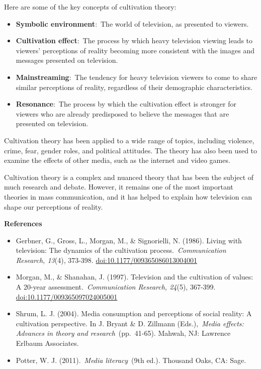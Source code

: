 \documentclass[
]{book}
\begin{document}
Here are some of the key concepts of cultivation theory:

\begin{itemize}
\item
  \textbf{Symbolic environment}:~The world of television, as presented to viewers.
\item
  \textbf{Cultivation effect}:~The process by which heavy television viewing leads to viewers' perceptions of reality becoming more consistent with the images and messages presented on television.
\item
  \textbf{Mainstreaming}:~The tendency for heavy television viewers to come to share similar perceptions of reality, regardless of their demographic characteristics.
\item
  \textbf{Resonance}:~The process by which the cultivation effect is stronger for viewers who are already predisposed to believe the messages that are presented on television.
\end{itemize}

Cultivation theory has been applied to a wide range of topics, including violence, crime, fear, gender roles, and political attitudes. The theory has also been used to examine the effects of other media, such as the internet and video games.

Cultivation theory is a complex and nuanced theory that has been the subject of much research and debate. However, it remains one of the most important theories in mass communication, and it has helped to explain how television can shape our perceptions of reality.

\textbf{References}

\begin{itemize}
\item
  Gerbner, G., Gross, L., Morgan, M., \& Signorielli, N. (1986). Living with television: The dynamics of the cultivation process.~\emph{Communication Research, 13}(4), 373-398. \url{doi:10.1177/009365086013004001}
\item
  Morgan, M., \& Shanahan, J. (1997). Television and the cultivation of values: A 20-year assessment.~\emph{Communication Research, 24}(5), 367-399. \url{doi:10.1177/009365097024005001}
\item
  Shrum, L. J. (2004). Media consumption and perceptions of social reality: A cultivation perspective. In J. Bryant \& D. Zillmann (Eds.),~\emph{Media effects: Advances in theory and research}~(pp.~41-65). Mahwah, NJ: Lawrence Erlbaum Associates.
\item
  Potter, W. J. (2011).~\emph{Media literacy}~(9th ed.). Thousand Oaks, CA: Sage.
\end{itemize}
\end{document}
